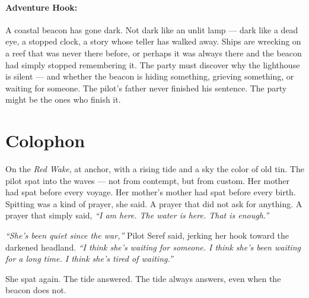 \paragraph{Adventure Hook:}
A coastal beacon has gone dark. Not dark like an unlit lamp --- dark like a dead eye, a stopped clock, a story whose teller has walked away. Ships are wrecking on a reef that was never there before, or perhaps it was always there and the beacon had simply stopped remembering it. The party must discover why the lighthouse is silent --- and whether the beacon is hiding something, grieving something, or waiting for someone. The pilot's father never finished his sentence. The party might be the ones who finish it.

\section*{Colophon}
On the \textit{Red Wake}, at anchor, with a rising tide and a sky the color of old tin. The pilot spat into the waves --- not from contempt, but from custom. Her mother had spat before every voyage. Her mother's mother had spat before every birth. Spitting was a kind of prayer, she said. A prayer that did not ask for anything. A prayer that simply said, \textit{``I am here. The water is here. That is enough.''}

\textit{``She's been quiet since the war,''} Pilot Seref said, jerking her hook toward the darkened headland. \textit{``I think she's waiting for someone. I think she's been waiting for a long time. I think she's tired of waiting.''}

She spat again. The tide answered. The tide always answers, even when the beacon does not.